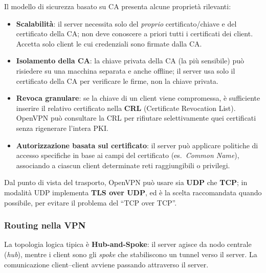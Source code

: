 Il modello di sicurezza basato su CA presenta alcune proprietà rilevanti:
\begin{itemize}
    \item \textbf{Scalabilità}: il server necessita solo del \textit{proprio} certificato/chiave
          e del certificato della CA; non deve conoscere a priori tutti i certificati dei client.
          Accetta solo client le cui credenziali sono firmate dalla CA.
    \item \textbf{Isolamento della CA}: la chiave privata della CA (la più sensibile)
          può risiedere su una macchina separata e anche offline; il server usa solo il
          certificato della CA per verificare le firme, non la chiave privata.
    \item \textbf{Revoca granulare}: se la chiave di un client viene compromessa, è sufficiente
          inserire il relativo certificato nella \textbf{CRL} (Certificate Revocation List).
          OpenVPN può consultare la CRL per rifiutare selettivamente quei certificati senza
          rigenerare l’intera PKI.
    \item \textbf{Autorizzazione basata sul certificato}: il server può applicare politiche
          di accesso specifiche in base ai campi del certificato (es.\ \emph{Common Name}),
          associando a ciascun client determinate reti raggiungibili o privilegi.
\end{itemize}

Dal punto di vista del trasporto, OpenVPN può usare sia \textbf{UDP} che \textbf{TCP}; in
modalità UDP implementa \textbf{TLS over UDP}, ed è la scelta raccomandata quando possibile,
per evitare il problema del “TCP over TCP”.

\subsubsection{Routing nella VPN}

La topologia logica tipica è \textbf{Hub-and-Spoke}: il server agisce da nodo centrale
(\emph{hub}), mentre i client sono gli \emph{spoke} che stabiliscono un tunnel verso il server.
La comunicazione client–client avviene passando attraverso il server.

